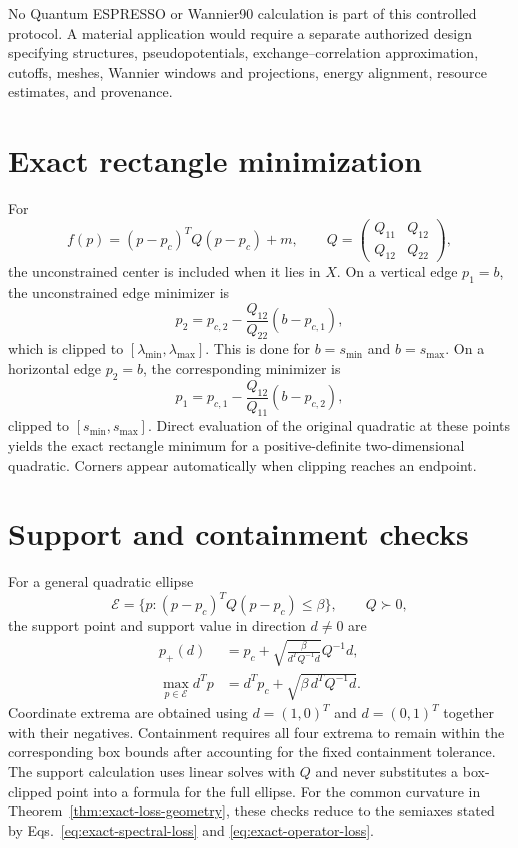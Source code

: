 \documentclass[11pt]{article}
\begin{document}
No Quantum ESPRESSO or Wannier90 calculation is part of this controlled protocol. A
material application would require a separate authorized design specifying structures,
pseudopotentials, exchange--correlation approximation, cutoffs, meshes, Wannier
windows and projections, energy alignment, resource estimates, and provenance.




\appendix

\section{Exact rectangle minimization}

For
\[
 f(p)=(p-p_c)^TQ(p-p_c)+m,
 \qquad
 Q=
 \begin{pmatrix}Q_{11}&Q_{12}\\Q_{12}&Q_{22}\end{pmatrix},
\]
the unconstrained center is included when it lies in $X$. On a vertical edge $p_1=b$,
the unconstrained edge minimizer is
\[
 p_2=p_{c,2}-\frac{Q_{12}}{Q_{22}}(b-p_{c,1}),
\]
which is clipped to $[\lambda_{\min},\lambda_{\max}]$. This is done for
$b=s_{\min}$ and $b=s_{\max}$. On a horizontal edge $p_2=b$, the corresponding minimizer
is
\[
 p_1=p_{c,1}-\frac{Q_{12}}{Q_{11}}(b-p_{c,2}),
\]
clipped to $[s_{\min},s_{\max}]$. Direct evaluation of the original quadratic at these
points yields the exact rectangle minimum for a positive-definite two-dimensional
quadratic. Corners appear automatically when clipping reaches an endpoint.

\section{Support and containment checks}

For a general quadratic ellipse
\[
 \mathcal E=\{p:(p-p_c)^TQ(p-p_c)\le\beta\},
 \qquad Q\succ0,
\]
the support point and support value in direction $d\ne0$ are
\begin{align}
 p_+(d)&=p_c+
 \sqrt{\frac{\beta}{d^TQ^{-1}d}}Q^{-1}d,\\
 \max_{p\in\mathcal E}d^Tp
 &=d^Tp_c+\sqrt{\beta\,d^TQ^{-1}d}.
\end{align}
Coordinate extrema are obtained using $d=(1,0)^T$ and $d=(0,1)^T$ together with their
negatives. Containment requires all four extrema to remain within the corresponding box
bounds after accounting for the fixed containment tolerance. The support calculation
uses linear solves with $Q$ and never substitutes a box-clipped point into a formula for
the full ellipse. For the common curvature in
Theorem~\ref{thm:exact-loss-geometry}, these checks reduce to the semiaxes stated by
Eqs.~\eqref{eq:exact-spectral-loss} and \eqref{eq:exact-operator-loss}.
\end{document}
